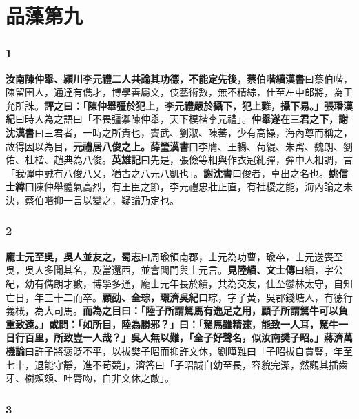 \chapter{品藻第九}

\subsection*{1}

\textbf{汝南陳仲舉、潁川李元禮二人共論其功德，不能定先後，蔡伯喈}{\footnotesize \textbf{續漢書}曰蔡伯喈，陳留圉人，通達有儁才，博學善屬文，伎藝術數，無不精綜，仕至左中郎將，為王允所誅。}\textbf{評之曰：「陳仲舉彊於犯上，李元禮嚴於攝下，犯上難，攝下易。」}{\footnotesize \textbf{張璠漢紀}曰時人為之語曰「不畏彊禦陳仲舉，天下模楷李元禮」。}\textbf{仲舉遂在三君之下，}{\footnotesize \textbf{謝沈漢書}曰三君者，一時之所貴也，竇武、劉淑、陳蕃，少有高操，海內尊而稱之，故得因以為目，}\textbf{元禮居八俊之上。}{\footnotesize \textbf{薛瑩漢書}曰李膺、王暢、荀緄、朱㝢、魏朗、劉佑、杜楷、趙典為八俊。\textbf{英雄記}曰先是，張儉等相與作衣冠糺彈，彈中人相調，言「我彈中誠有八俊八乂，猶古之八元八凱也」。\textbf{謝沈書}曰俊者，卓出之名也。\textbf{姚信士緯}曰陳仲舉體氣高烈，有王臣之節，李元禮忠壯正直，有社稷之能，海內論之未決，蔡伯喈抑一言以變之，疑論乃定也。}

\subsection*{2}

\textbf{龐士元至吳，吳人並友之，}{\footnotesize \textbf{蜀志}曰周瑜領南郡，士元為功曹，瑜卒，士元送喪至吳，吳人多聞其名，及當還西，並會閶門與士元言。}\textbf{見陸績、}{\footnotesize \textbf{文士傳}曰績，字公紀，幼有儁朗才數，博學多通，龐士元年長於績，共為交友，仕至鬱林太守，自知亡日，年三十二而卒。}\textbf{顧劭、全琮，}{\footnotesize \textbf{環濟吳紀}曰琮，字子黃，吳郡錢塘人，有德行義概，為大司馬。}\textbf{而為之目曰：「陸子所謂駑馬有逸足之用，顧子所謂駑牛可以負重致遠。」或問：「如所目，陸為勝邪？」曰：「駑馬雖精速，能致一人耳，駑牛一日行百里，所致豈一人哉？」吳人無以難，「全子好聲名，似汝南樊子昭。」}{\footnotesize \textbf{蔣濟萬機論}曰許子將褒貶不平，以拔樊子昭而抑許文休，劉曄難曰「子昭拔自賈豎，年至七十，退能守靜，進不苟競」，濟答曰「子昭誠自幼至長，容貌完潔，然觀其插齒牙、樹頰頦、吐脣吻，自非文休之敵」。}

\subsection*{3}


